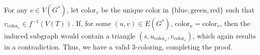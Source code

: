 \documentclass[12pt]{article}
\begin{document}
	\medskip
	
	For any \(v \in V(G^{\ast})\), let \(\text{color}_{v}\) be the unique
	color in \(\{\text{blue}, \text{green}, \text{red}\}\) such that
	\(v_{\text{color}_v} \in f^{-1}(V(T))\). If, for some \((u, v) \in
	E(G^{\ast})\), \(\text{color}_{u} = \text{color}_{v}\), then the induced
	subgraph would contain a triangle \((s, u_{\text{color}_{u}},
	v_{\text{color}_{v}})\), which again results in a contradiction. Thus, we
	have a valid \(3\)-coloring, completing the proof.
\end{document}
